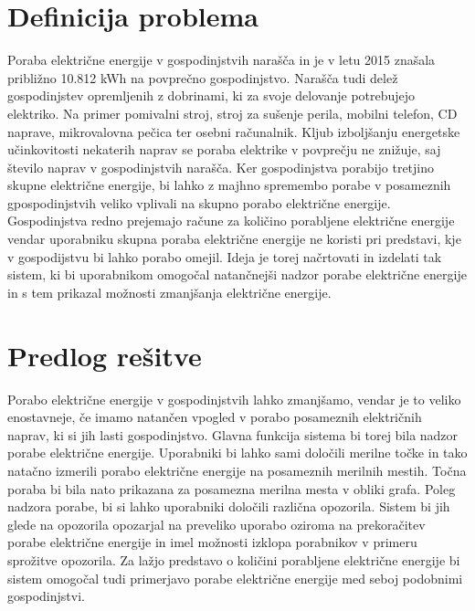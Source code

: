 \documentclass[12pt,a4paper,titlepage,openany]{report}
\begin{document}
\section{Definicija problema}
\thispagestyle{fancy}
Poraba električne energije v gospodinjstvih narašča in je v letu 2015 znašala približno 10.812  kWh na povprečno gospodinjstvo.\cite{ElectricityConsumption} Narašča tudi delež gospodinjstev opremljenih z dobrinami, ki za svoje delovanje potrebujejo elektriko. Na primer pomivalni stroj, stroj za sušenje perila, mobilni telefon, CD naprave, mikrovalovna pečica ter osebni računalnik. Kljub izboljšanju energetske učinkovitosti nekaterih naprav se poraba elektrike v povprečju ne znižuje, saj število naprav v gospodinjstvih narašča. Ker gospodinjstva porabijo tretjino skupne električne energije, bi lahko z majhno spremembo porabe v posameznih gpospodinjstvih veliko vplivali na skupno porabo električne energije. Gospodinjstva redno prejemajo račune za količino porabljene električne energije vendar uporabniku skupna poraba električne energije ne koristi pri predstavi, kje v gospodijstvu bi lahko porabo omejil. Ideja je torej načrtovati in izdelati tak sistem, ki bi uporabnikom omogočal natančnejši nadzor porabe električne energije in s tem prikazal možnosti zmanjšanja električne energije.

\section{Predlog rešitve}
\thispagestyle{fancy}
Porabo električne energije v gospodinjstvih lahko zmanjšamo, vendar je to veliko enostavneje, če imamo natančen vpogled v porabo posameznih električnih naprav, ki si jih lasti gospodinjstvo. Glavna funkcija sistema bi torej bila nadzor porabe električne energije. Uporabniki bi lahko sami določili merilne točke in tako natačno izmerili porabo električne energije na posameznih merilnih mestih. Točna poraba bi bila nato prikazana za posamezna merilna mesta v obliki grafa. Poleg nadzora porabe, bi si lahko uporabniki določili različna opozorila. Sistem bi jih glede na opozorila opozarjal na preveliko uporabo oziroma na prekoračitev porabe električne energije in imel možnosti izklopa porabnikov v primeru sprožitve opozorila. Za lažjo predstavo o količini porabljene električne energije bi sistem omogočal tudi primerjavo porabe električne energije med seboj podobnimi gospodinjstvi.
\end{document}
